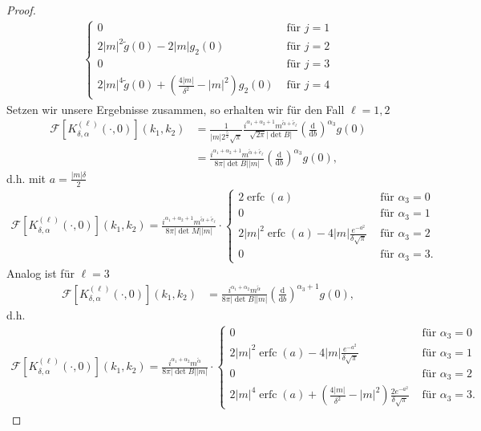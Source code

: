 \documentclass[12pt,a4paper]{scrartcl}
\newcommand{\dd}{\mathrm{d}}
\numberwithin{equation}{section}
\newcommand{\F}{\mathcal{F}} %
\newcommand{\erfc}{\operatorname{erfc}}
\begin{document}
\begin{proof}
\begin{align*}
\begin{cases}
0 &\text{ für } j=1 \\
2|m|^2 \tilde g (0) - 2 |m| g_2(0) &\text{ für } j=2\\
0 &\text{ für } j=3\\
2|m|^4 \tilde g(0) + \left( \frac{4|m|}{\delta^2}-|m|^2 \right) g_2(0) &\text{ für } j=4
\end{cases}
\end{align*}
Setzen wir unsere Ergebnisse zusammen, so erhalten wir für den Fall $\ell=1,2$
\begin{align*}
\F [K_{\delta,\alpha}^{(\ell)}(\cdot,0)](k_1,k_2) &= 
\frac{1}{|m| 2^{\frac{5}{2}}\sqrt{\pi}}\frac{i^{\alpha_1+\alpha_2+1} m^{\tilde \alpha+ \tilde e_\ell}}{\sqrt{2 \pi}|\det B|} \left(\frac{\dd}{\dd b}\right)^{\alpha_3}g(0) \\
&=\frac{i^{\alpha_1+\alpha_2+1} m^{\tilde \alpha+ \tilde e_\ell}}{8 \pi|\det B| |m|} \left(\frac{\dd}{\dd b}\right)^{\alpha_3}g(0),
\end{align*}
d.h. mit $a=\frac{|m|\delta}{2}$
\begin{align*}
\F [K_{\delta,\alpha}^{(\ell)}(\cdot,0)](k_1,k_2) = \frac{i^{\alpha_1+\alpha_2+1} m^{\tilde \alpha+ \tilde e_\ell}}{8 \pi|\det M| |m|} \cdot
\begin{cases}
2 \erfc(a) & \text{ für }\alpha_3=0\\
0 &\text{ für }\alpha_3=1\\
2 |m|^2 \erfc(a)-4|m|\frac{e^{-a^2}}{\delta \sqrt{\pi}} &\text{ für }\alpha_3=2\\
0 &\text{ für }\alpha_3=3.
\end{cases}
\end{align*}
Analog ist für $\ell=3$ 
\begin{align*}
\F [K_{\delta,\alpha}^{(\ell)}(\cdot,0)](k_1,k_2) &= \frac{i^{\alpha_1 + \alpha_2}  m^{\tilde \alpha}}{8 \pi |\det B| |m|}\left(\frac{\dd}{\dd b}\right)^{\alpha_3 +1}g(0),
\end{align*} d.h.
\begin{align*}
\F [K_{\delta,\alpha}^{(\ell)}(\cdot,0)](k_1,k_2) = \frac{i^{\alpha_1+\alpha_2} m^{\tilde \alpha}}{8 \pi|\det B| |m|} \cdot
\begin{cases}
0 &\text{ für }\alpha_3=0\\
2 |m|^2 \erfc(a)-4|m|\frac{e^{-a^2}}{\delta \sqrt{\pi}} &\text{ für }\alpha_3=1\\
0 &\text{ für }\alpha_3=2 \\
2|m|^4 \erfc(a)+ \left(\frac{4|m|}{\delta^2}-|m|^2 \right)\frac{2 e^{-a^2}}{\delta \sqrt{\pi}}  &\text{ für }\alpha_3=3.
\end{cases}
\end{align*}
\end{proof}
\end{document}
